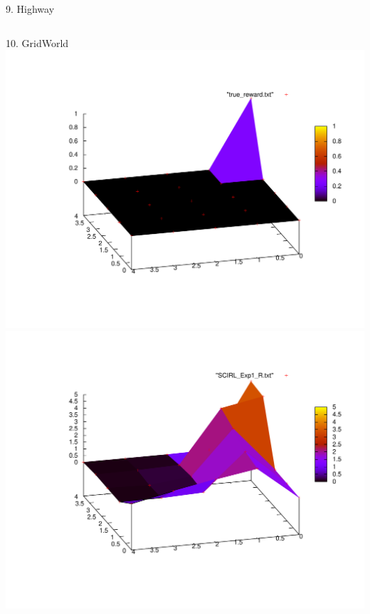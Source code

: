 \documentclass[xcolor=x11names,12pt]{beamer}
\begin{document}
\begin{frame}
\begin{columns}
\begin{column}{.48\textwidth}
\begin{block}{9. Highway}
\begin{columns}
\begin{column}{\textwidth}
        \end{column}
      \end{columns}             
    \end{block}
  \end{column}
\end{columns}
\vfill
  \begin{columns}
    \begin{column}{.48\textwidth}
      \begin{block}{10. GridWorld}
        \centering
\vspace{-70pt}
          \includegraphics[width=.52\textwidth]{true_reward.pdf}\hspace{-100pt}\includegraphics[width=.52\textwidth]{SCIRL_Exp1_R.pdf}\\
\vspace{-110pt}

\end{block}
\end{column}
\end{columns}
\end{frame}
\end{document}
